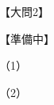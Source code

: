 \documentclass[../../../../hsm_tok_a.tex]{subfiles}
\begin{document}
    【大問2】

    【準備中】

    （1）


    （2）

\end{document}
